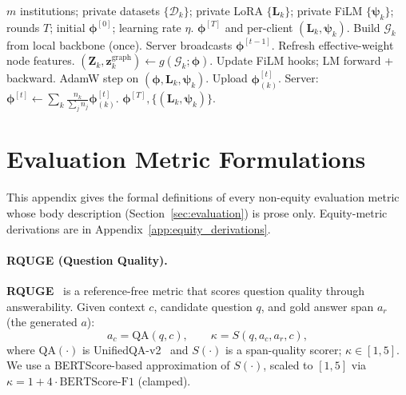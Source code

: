 \documentclass[11pt]{article}
\theoremstyle{plain}
\theoremstyle{definition}
\theoremstyle{remark}
\newcommand{\UniEdu}{\textsc{UnifiedEdu}}
\begin{document}
\begin{algorithm}[t]
\caption{\UniEdu{}: unified federated learning for AQAG.}
\label{alg:unifiededu}
\begin{algorithmic}[1]
\Require $m$ institutions; private datasets
  $\{\mathcal{D}_k\}$; private LoRA $\{\mathbf{L}_k\}$;
  private FiLM $\{\boldsymbol{\psi}_k\}$; rounds $T$;
  initial $\boldsymbol{\phi}^{[0]}$; learning rate
  $\eta$.
\Ensure $\boldsymbol{\phi}^{[T]}$ and per-client
  $(\mathbf{L}_k, \boldsymbol{\psi}_k)$.
  \State Build $\mathcal{G}_k$ from local backbone (once).
\EndFor
{}
  \State Server broadcasts $\boldsymbol{\phi}^{[t-1]}$.
      \State Refresh effective-weight node features.
      \State $(\mathbf{Z}_k, \mathbf{z}_k^{\text{graph}})
             \leftarrow g(\mathcal{G}_k;
             \boldsymbol{\phi})$.
      \State Update FiLM hooks; LM forward + backward.
      \State AdamW step on
             $(\boldsymbol{\phi}, \mathbf{L}_k,
             \boldsymbol{\psi}_k)$.
    \EndFor
    \State Upload
      $\boldsymbol{\phi}^{[t]}_{(k)}$.
  \EndFor
  \State Server: $\boldsymbol{\phi}^{[t]} \leftarrow
         \sum_k \frac{n_k}{\sum_j n_j}
         \boldsymbol{\phi}^{[t]}_{(k)}$.
\EndFor
\State \Return $\boldsymbol{\phi}^{[T]},
       \{(\mathbf{L}_k, \boldsymbol{\psi}_k)\}$.
\end{algorithmic}
\end{algorithm}

\section{Evaluation Metric Formulations}
\label{app:eval_formulations}

This appendix gives the formal definitions of every
non-equity evaluation metric whose body description
(Section~\ref{sec:evaluation}) is prose only.
Equity-metric derivations are in
Appendix~\ref{app:equity_derivations}.

\paragraph{RQUGE (Question Quality).}
\textbf{RQUGE}~\citep{mohammadshahi2023rquge} is a
reference-free metric that scores question quality
through answerability. Given context $c$, candidate
question $q$, and gold answer span $a_r$ (the
generated $a$):
\begin{equation}
  a_c = \mathrm{QA}(q, c),\qquad
  \kappa = S(q, a_c, a_r, c),
  \label{eq:rquge}
\end{equation}
where $\mathrm{QA}(\cdot)$ is
UnifiedQA-v2~\citep{khashabi2022unifiedqa} and
$S(\cdot)$ is a span-quality scorer; $\kappa \in [1,
5]$. We use a BERTScore-based approximation of
$S(\cdot)$, scaled to $[1, 5]$ via $\kappa = 1 + 4
\cdot \mathrm{BERTScore\text{-}F1}$ (clamped).
\end{document}
